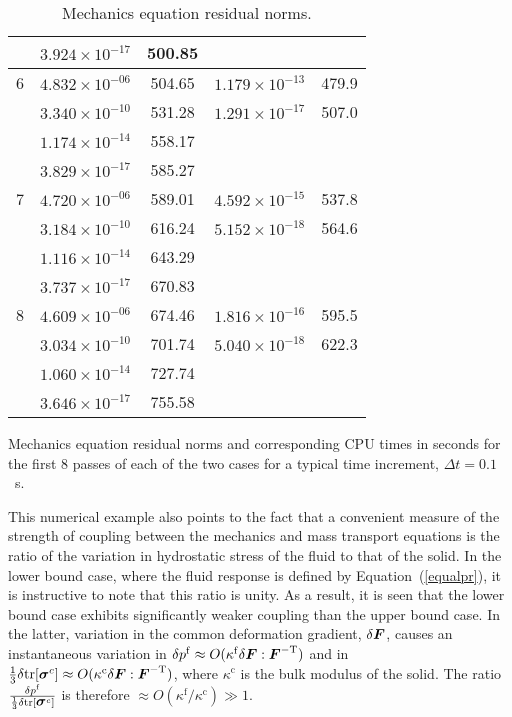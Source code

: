 \begin{table}
\begin{center}
\begin{tabular}{|r|c|c|c|c|}
&$3.924\times10^{-17}$& 500.85  &$                   $&       \\
\hline 6
&$4.832\times10^{-06}$& 504.65  &$1.179 \times10^{-13}$& 479.9 \\
&$3.340\times10^{-10}$& 531.28  &$1.291 \times10^{-17}$& 507.0 \\
&$1.174\times10^{-14}$& 558.17  &$                   $&       \\
&$3.829\times10^{-17}$& 585.27  &$                   $&       \\
\hline 7
&$4.720\times10^{-06}$& 589.01  &$4.592 \times10^{-15}$& 537.8 \\
&$3.184\times10^{-10}$& 616.24  &$5.152 \times10^{-18}$& 564.6 \\
&$1.116\times10^{-14}$& 643.29  &$                   $&       \\
&$3.737\times10^{-17}$& 670.83  &$                   $&       \\
\hline 8                                   
&$4.609\times10^{-06}$& 674.46  &$1.816\times10^{-16}$& 595.5 \\
&$3.034\times10^{-10}$& 701.74  &$5.040\times10^{-18}$& 622.3 \\
&$1.060\times10^{-14}$& 727.74  &$                   $&       \\
&$3.646\times10^{-17}$& 755.58  &$                   $&       \\
\hline
\end{tabular}
\caption{Mechanics equation residual norms.}
\label{resnorms}
\end{center}
{Mechanics equation residual norms and corresponding CPU times in
  seconds for the first 8 passes of each of the two cases for a
  typical time increment, \mbox{$\Delta t=0.1$ s}.}
\end{table}

This numerical example also points to the fact that a convenient
measure of the strength of coupling between the mechanics and mass
transport equations is the ratio of the variation in hydrostatic
stress of the fluid to that of the solid. In the lower bound case,
where the fluid response is defined by Equation~(\ref{equalpr}), it is
instructive to note that this ratio is unity. As a result, it is seen
that the lower bound case exhibits significantly weaker coupling than
the upper bound case. In the latter, variation in the common
deformation gradient, $\delta \mbox{\boldmath$ F$}$, causes an instantaneous variation
in \mbox{$\delta p^{\mathrm{f}} \approx O(\kappa^{\mathrm{f}} \delta
\mbox{\boldmath$ F$}:\mbox{\boldmath$ F$}^{-\mathrm{T}})$} and in \mbox{$\frac{1}{3} \delta\mathrm{tr}
  [\mbox{\boldmath$\sigma$}^{c}] \approx O(\kappa^{\mathrm{c}} \delta \mbox{\boldmath$ F$}:\mbox{\boldmath$ F$} ^
  {-\mathrm{T}})$}, where $\kappa^{\mathrm{c}}$ is the bulk modulus of
the solid. The ratio $\frac{\delta p^{\mathrm{f}}}{\frac{1}{3} \delta
  \mathrm{tr}[\mbox{\boldmath$\sigma$}^{c}]}$ is therefore \mbox{$\approx O(\kappa ^
  {\mathrm{f}}/\kappa^{\mathrm{c}}) \gg 1$}.

